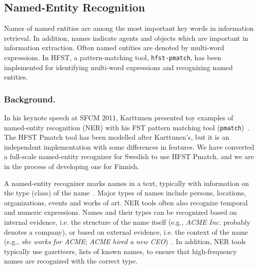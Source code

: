 \documentclass{llncs}
\begin{document}
% 

\subsection{Named-Entity Recognition}
Names of named entities are among the most important key words in information retrieval. In addition, names indicate agents and objects which are important in information extraction. Often named entities are denoted by multi-word expressions. In HFST, a pattern-matching tool, {\tt hfst-pmatch}, has been implemented for identifying multi-word expressions and recognizing named entities.

\subsubsection{Background.}
In his keynote speech at SFCM 2011, Karttunen presented toy examples of named-entity recognition (NER) with
his FST pattern matching tool (\texttt{pmatch})~\cite{karttunen/2011}. 
The HFST Pmatch tool has been modelled after
Karttunen's, but it is an independent implementation with
some differences in features. We have
converted a full-scale named-entity recognizer for Swedish to use
HFST Pmatch, and we are in the process of developing one for Finnish.

A named-entity recognizer marks names in a text, typically with
information on the type (class) of the name~\cite{nadeau/2007}. Major
types of names include persons, locations, organizations, events and
works of art. NER tools often also recognize temporal and numeric
expressions. Names and their types can be recognized based on internal
evidence, i.e. the structure of the name itself (e.g., \textit{ACME
  Inc.} probably denotes a company), or based on external evidence,
i.e. the context of the name (e.g., \textit{she works for ACME};
\textit{ACME hired a new CEO})~\cite{mcdonald/1996}. In
addition, NER tools typically use gazetteers, lists of known names, to
ensure that high-frequency names are recognized with the correct type.
\end{document}
